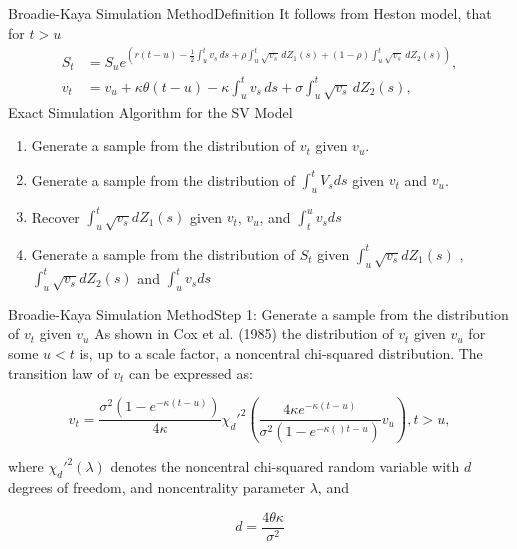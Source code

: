 \begin{frame}{Broadie-Kaya Simulation Method}{Definition}
    It follows from Heston model, that for $t > u$
    \begin{align}
         S_t &= S_u e^{\left( r(t-u)-\frac{1}{2} \int_{u}^{t} v_s \, ds  + \rho\int_{u}^{t} \sqrt{v_s} \, dZ_1(s) + (1-\rho)\int_{u}^{t} \sqrt{v_s} \, dZ_2(s)  \right)}, \label{BK:Price_int} \\
         v_t &= v_u + \kappa\theta(t-u) - \kappa \int_{u}^{t} v_s \, ds + \sigma\int_{u}^{t} \sqrt{v_s} \, dZ_2(s), \label{BK:Vol_int}
    \end{align}
    Exact Simulation Algorithm for the SV Model
    \begin{enumerate}
        \item[Step 1] Generate a sample from the distribution of $v_t$ given $v_u$.
        \item[Step 2] Generate a sample from the distribution of $\int_{u}^t V_s ds$ given $v_t$ and $v_u$.
        \item[Step 3] Recover $\int_{u}^t \sqrt{v_s} dZ_1(s)$ given $v_t$, $v_u$, and
        $\int_{t}^u v_s ds$
        \item[Step 4] Generate a sample from the distribution of $S_t$ given $\int_{u}^t \sqrt{v_s} dZ_1(s)$ , $\int_{u}^t \sqrt{v_s} dZ_2(s)$ and $\int_{u}^t v_s ds$
    \end{enumerate}
\end{frame}

\begin{frame}{Broadie-Kaya Simulation Method}{Step 1: Generate a sample from the distribution of $v_t$ given $v_u$}
    As shown in Cox et al. (1985) the distribution of $v_t$ given $v_u$ for some $u < t$ is, up to a scale factor, a noncentral chi-squared distribution. The transition law of $v_t$ can be expressed as:

    \begin{equation}
        v_t = \frac{\sigma^2(1-e^{-\kappa(t-u)})}{4\kappa}\chi_d'^{2}\left(\frac{4\kappa e^{-\kappa(t-u)}}{\sigma^2(1-e^{-\kappa()t-u})} v_u  \right), t > u , \label{BK:vol_law}
    \end{equation}

    where $\chi_d'^{2}(\lambda)$ denotes the noncentral chi-squared random
    variable with $d$ degrees of freedom, and noncentrality
    parameter $\lambda$, and

    \begin{equation}
        d = \frac{4\theta\kappa}{\sigma^2} \label{BK:vol_law:parameter}
    \end{equation}
    
\end{frame}


